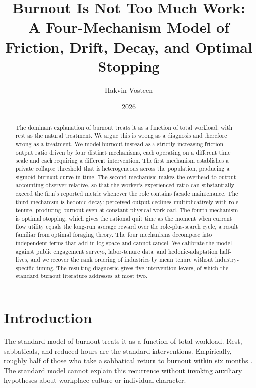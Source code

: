 \documentclass[11pt]{article}
\title{\Large\textbf{Burnout Is Not Too Much Work:}\\
A Four-Mechanism Model of Friction, Drift, Decay, and Optimal Stopping}
\author{Hakvin Vosteen}
\date{2026}
\begin{document}
\maketitle

\begin{abstract}
\noindent The dominant explanation of burnout treats it as a function of total
workload, with rest as the natural treatment. We argue this is wrong as a
diagnosis and therefore wrong as a treatment. We model burnout instead as a
strictly increasing friction-output ratio driven by four distinct mechanisms,
each operating on a different time scale and each requiring a different
intervention. The first mechanism establishes a private collapse threshold
that is heterogeneous across the population, producing a sigmoid burnout
curve in time. The second mechanism makes the overhead-to-output accounting
observer-relative, so that the worker's experienced ratio can substantially
exceed the firm's reported metric whenever the role contains facade
maintenance. The third mechanism is hedonic decay: perceived output declines
multiplicatively with role tenure, producing burnout even at constant
physical workload. The fourth mechanism is optimal stopping, which gives the
rational quit time as the moment when current flow utility equals the long-run
average reward over the role-plus-search cycle, a result familiar from
optimal foraging theory. The four mechanisms decompose into independent terms
that add in log space and cannot cancel. We calibrate the model against
public engagement surveys, labor-tenure data, and hedonic-adaptation
half-lives, and we recover the rank ordering of industries by mean tenure
without industry-specific tuning. The resulting diagnostic gives five
intervention levers, of which the standard burnout literature addresses at
most two.
\end{abstract}

\section{Introduction}

The standard model of burnout treats it as a function of total workload. Rest,
sabbaticals, and reduced hours are the standard interventions. Empirically,
roughly half of those who take a sabbatical return to burnout within six
months \cite{maslach2016}. The standard model cannot explain this recurrence
without invoking auxiliary hypotheses about workplace culture or individual
character.
\end{document}
